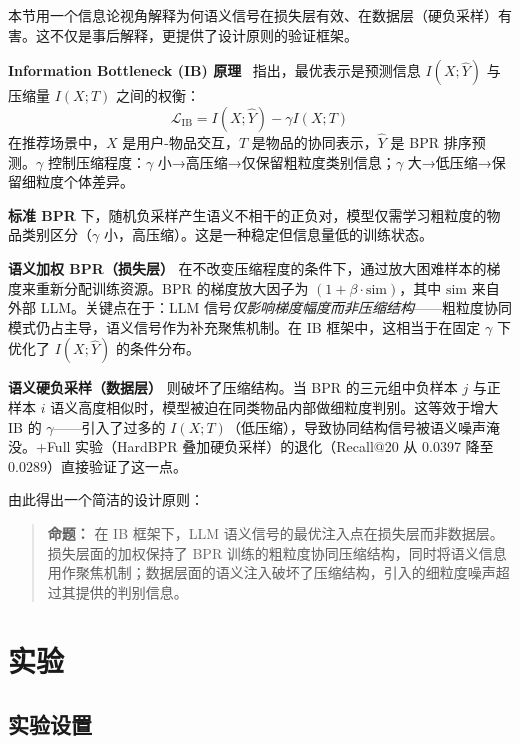 \documentclass[11pt,a4paper]{article}
\begin{document}
本节用一个信息论视角解释为何语义信号在损失层有效、在数据层（硬负采样）有害。这不仅是事后解释，更提供了设计原则的验证框架。

\textbf{Information Bottleneck (IB) 原理}~\cite{Tishby2000} 指出，最优表示是预测信息 $I(X;\hat{Y})$ 与压缩量 $I(X;T)$ 之间的权衡：
\begin{equation}
    \mathcal{L}_{\text{IB}} = I(X;\hat{Y}) - \gamma I(X;T)
\end{equation}
在推荐场景中，$X$ 是用户-物品交互，$T$ 是物品的协同表示，$\hat{Y}$ 是 BPR 排序预测。$\gamma$ 控制压缩程度：$\gamma$ 小→高压缩→仅保留粗粒度类别信息；$\gamma$ 大→低压缩→保留细粒度个体差异。

\textbf{标准 BPR} 下，随机负采样产生语义不相干的正负对，模型仅需学习粗粒度的物品类别区分（$\gamma$ 小，高压缩）。这是一种稳定但信息量低的训练状态。

\textbf{语义加权 BPR（损失层）} 在不改变压缩程度的条件下，通过放大困难样本的梯度来重新分配训练资源。BPR 的梯度放大因子为 $(1 + \beta \cdot \text{sim})$，其中 $\text{sim}$ 来自外部 LLM。关键点在于：LLM 信号\emph{仅影响梯度幅度而非压缩结构}——粗粒度协同模式仍占主导，语义信号作为补充聚焦机制。在 IB 框架中，这相当于在固定 $\gamma$ 下优化了 $I(X;\hat{Y})$ 的条件分布。

\textbf{语义硬负采样（数据层）} 则破坏了压缩结构。当 BPR 的三元组中负样本 $j$ 与正样本 $i$ 语义高度相似时，模型被迫在同类物品内部做细粒度判别。这等效于增大 IB 的 $\gamma$——引入了过多的 $I(X;T)$（低压缩），导致协同结构信号被语义噪声淹没。+Full 实验（HardBPR 叠加硬负采样）的退化（Recall@20 从 0.0397 降至 0.0289）直接验证了这一点。

由此得出一个简洁的设计原则：
\begin{quote}
    \textbf{命题：} 在 IB 框架下，LLM 语义信号的最优注入点在损失层而非数据层。损失层面的加权保持了 BPR 训练的粗粒度协同压缩结构，同时将语义信息用作聚焦机制；数据层面的语义注入破坏了压缩结构，引入的细粒度噪声超过其提供的判别信息。
\end{quote}

\section{实验}

\subsection{实验设置}
\end{document}
